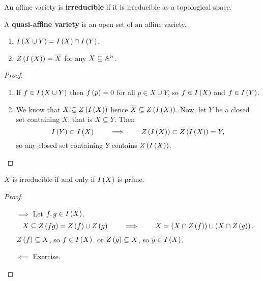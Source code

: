 \begin{definition}
An affine variety is \textbf{irreducible} if it is irreducible as a topological space.
\end{definition}

\begin{remark1}
A \textbf{quasi-affine variety} is an open set of an affine variety.
\end{remark1}

\begin{proposition}
\hfill
\begin{enumerate}
\item $ I\left( X \cup Y \right) = I\left( X \right) \cap I\left( Y \right) $.
\item $ Z\left( I\left( X \right) \right) = \overline{X} $ for any $ X \subseteq \mathbb{A}^n $.
\end{enumerate}
\end{proposition}

\begin{proof}
\hfill
\begin{enumerate}
\item If $ f \in I\left( X \cup Y \right) $ then $ f\left( p \right) = 0 $ for all $ p \in X \cup Y $, so $ f \in I\left( X \right) $ and $ f \in I\left( Y \right) $.
\item We know that $ X \subseteq Z\left( I\left( X \right) \right) $ hence $ \overline{X} \subseteq Z\left( I\left( X \right) \right) $. Now, let $ Y $ be a closed set containing $ X $, that is $ X \subseteq Y $. Then
$$ I\left( Y \right) \subset I\left( X \right) \qquad \implies \qquad Z\left( I\left( X \right) \right) \subset Z\left( I\left( X \right) \right) = Y, $$
so any closed set containing $ Y $ contains $ Z\left( I\left( X \right) \right) $.
\end{enumerate}
\end{proof}

\begin{proposition}
$ X $ is irreducible if and only if $ I\left( X \right) $ is prime.
\end{proposition}

\begin{proof}
\hfill
\begin{itemize}
\item[$ \implies $] Let $ f, g \in I\left( X \right) $.
$$ X \subseteq Z\left( fg \right) = Z\left( f \right) \cup Z\left( g \right) \qquad \implies \qquad X = \left( X \cap Z\left( f \right) \right) \cup \left( X \cap Z\left( g \right) \right). $$
$ Z\left( f \right) \subseteq X $, so $ f \in I\left( X \right) $, or $ Z\left( g \right) \subseteq X $, so $ g \in I\left( X \right) $.
\item[$ \impliedby $] Exercise.
\end{itemize}
\end{proof}

